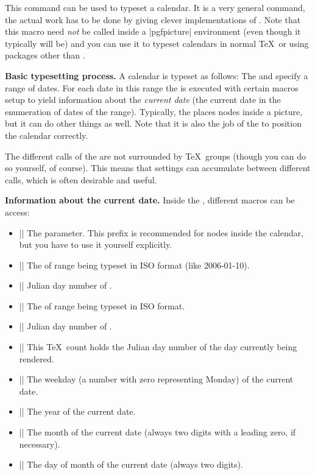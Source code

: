 \begin{command}{\pgfcalendar{}}
    This command can be used to typeset a calendar. It is a very general
    command, the actual work has to be done by giving clever implementations of
    . Note that this macro need \emph{not} be called
    inside a |{pgfpicture}| environment (even though it typically will be) and
    you can use it to typeset calendars in normal \TeX\ or using packages other
    than \pgfname.


    \medskip
    \textbf{Basic typesetting process.}
    A calendar is typeset as follows: The  and 
    specify a range of dates. For each date in this range the  is executed with certain macros setup to yield information about the
    \emph{current date} (the current date in the enumeration of dates of the
    range). Typically, the  places nodes inside a picture,
    but it can do other things as well. Note that it is also the job of the
     to position the calendar correctly.

    The different calls of the  are not surrounded by \TeX\
    groups (though you can do so yourself, of course). This means that settings
    can accumulate between different calls, which is often desirable and
    useful.


    \medskip
    \textbf{Information about the current date.}
    Inside the , different macros can be access:
    \begin{itemize}
        \item |\pgfcalendarprefix| The  parameter. This prefix is
            recommended for nodes inside the calendar, but you have to use it
            yourself explicitly.
        \item |\pgfcalendarbeginiso| The  of range being
            typeset in ISO format (like 2006-01-10).
        \item |\pgfcalendarbeginjulian| Julian day number of .
        \item |\pgfcalendarendiso| The \meta{end date} of range being typeset
            in ISO format.
        \item |\pgfcalendarendjulian| Julian day number of .
        \item |\pgfcalendarcurrentjulian| This \TeX\ count holds the Julian day
            number of the day currently being rendered.
        \item |\pgfcalendarcurrentweekday| The weekday (a number with zero
            representing Monday) of the current date.
        \item |\pgfcalendarcurrentyear| The year of the current date.
        \item |\pgfcalendarcurrentmonth| The month of the current date (always
            two digits with a leading zero, if necessary).
        \item |\pgfcalendarcurrentday| The day of month of the current date
            (always two digits).
    \end{itemize}



\end{command}
